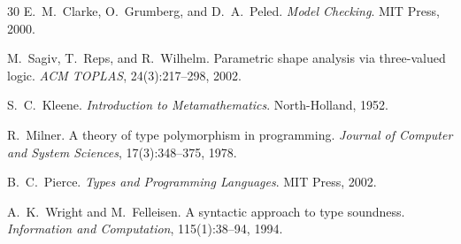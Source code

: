 \documentclass[runningheads]{llncs}
\begin{document}
\begin{thebibliography}{30}
E.~M.~Clarke, O.~Grumberg, and D.~A.~Peled.
\newblock \emph{Model Checking}.
\newblock MIT Press, 2000.

M.~Sagiv, T.~Reps, and R.~Wilhelm.
\newblock Parametric shape analysis via three-valued logic.
\newblock \emph{ACM TOPLAS}, 24(3):217--298, 2002.

S.~C.~Kleene.
\newblock \emph{Introduction to Metamathematics}.
\newblock North-Holland, 1952.

R.~Milner.
\newblock A theory of type polymorphism in programming.
\newblock \emph{Journal of Computer and System Sciences},
  17(3):348--375, 1978.

B.~C.~Pierce.
\newblock \emph{Types and Programming Languages}.
\newblock MIT Press, 2002.

A.~K.~Wright and M.~Felleisen.
\newblock A syntactic approach to type soundness.
\newblock \emph{Information and Computation}, 115(1):38--94, 1994.

\end{thebibliography}
\end{document}
